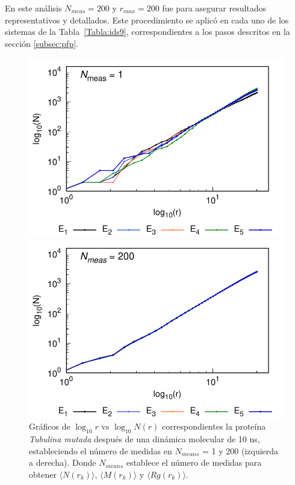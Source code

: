 	En este an\'{a}lisis $N_{meas} = 200 $ y $r_{max} = 200$ fue para asegurar resultados 
	representativos y detallados. Este procedimiento se aplic\'{o} en cada uno 
	de los sistemas de la Tabla~\ref{Tabla:ids9}, correspondientes a 
	los pasos descritos en la secci\'{o}n \ref{subsec:pfp}.
	

	\begin{figure}[H]
		\hspace{-0.3cm} 
		\begin{minipage}{0.49\textwidth}
			\centering
			\includegraphics[width=\linewidth,page=1]{graphs/PDBs/Tubb4/TubMutA=1.pdf}
		\end{minipage}
		\hspace{0.2cm}
		\begin{minipage}{0.49\textwidth}
			\centering
			\includegraphics[width=\linewidth,page=1]{graphs/PDBs/Tubb4/TubMutA=200.pdf}
		\end{minipage}
		
		\caption{
			Gr\'{a}ficos de $\log_{10}r$ vs $\log_{10}N(r)$ correspondientes la prote\'{i}na \textit{Tubulina mutada} despu\'{e}s de una din\'{a}mica molecular de 10 ns, estableciendo el n\'{u}mero de medidas en  $N_{means}$ = 1 y 200 (izquierda a derecha). Donde $N_{means}$ establece el n\'{u}mero de medidas para obtener $\langle N(r_k) \rangle$, $\langle M(r_k) \rangle$ y $\langle Rg(r_k) \rangle$.}
		\label{fig:Nmeasp}
	\end{figure}
	
